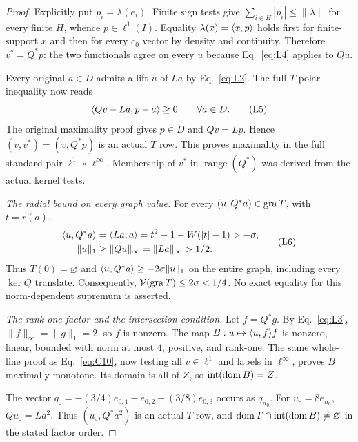 \begin{proof}
Explicitly put $p_i=\lambda(e_i)$. Finite sign tests give
$\sum_{i\in H}|p_i|\le\|\lambda\|$ for every finite $H$, whence
$p\in\ell^1(I)$. Equality $\lambda(x)=\langle x,p\rangle$ holds first for
finite-support $x$ and then for every $c_0$ vector by density and continuity.
Therefore $v^*=Q^*p$: the two functionals agree on every $u$ because
Eq.~\eqref{eq:L4} applies to $Qu$.

Every original $a\in D$ admits a lift $u$ of $La$ by Eq.~\eqref{eq:L2}.
The full $T$-polar inequality now reads
\begin{equation}
\langle Qv-La,p-a\rangle\ge0\qquad\forall a\in D.
\tag{L5}\label{eq:L5}
\end{equation}
The original maximality proof gives $p\in D$ and $Qv=Lp$. Hence
$(v,v^*)=(v,Q^*p)$ is an actual $T$ row. This proves maximality in the
full standard pair $\ell^1\times\ell^\infty$. Membership of $v^*$ in
$\operatorname{range}(Q^*)$ was derived from the actual kernel tests.

\noindent\textit{The radial bound on every graph value.}
\label{sec:L3}
For every $(u,Q^*a)\in\operatorname{gra} T$, with $t=r(a)$,
\begin{equation}
\begin{aligned}
\langle u,Q^*a\rangle&=\langle La,a\rangle
 =t^2-1-W(|t|-1)>-\sigma,\\
\|u\|_1&\ge\|Qu\|_\infty=\|La\|_\infty>1/2.
\end{aligned}
\tag{L6}\label{eq:L6}
\end{equation}
Thus $T(0)=\varnothing$ and $\langle u,Q^*a\rangle\ge-2\sigma\|u\|_1$ on
the entire graph, including every $\ker Q$ translate. Consequently,
$\mathcal V(\operatorname{gra} T)\le2\sigma<1/4$. No exact equality for this
norm-dependent supremum is asserted.

\noindent\textit{The rank-one factor and the intersection condition.}
\label{sec:L4}
Let $f=Q^*g$. By Eq.~\eqref{eq:L3}, $\|f\|_\infty=\|g\|_1=2$, so $f$
is nonzero. The map $B:u\mapsto\langle u,f\rangle f$ is nonzero, linear, bounded
with norm at most $4$, positive, and rank-one. The same whole-line proof
as Eq.~\eqref{eq:C10}, now testing all $v\in\ell^1$ and labels in
$\ell^\infty$, proves $B$ maximally monotone.
Its domain is all of $Z$, so $\operatorname{int}(\operatorname{dom} B)=Z$.

The vector $q_\circ=-(3/4)e_{0,1}-e_{0,2}-(3/8)e_{0,3}$ occurs as
$q_{n_0}$. For $u_\circ=8e_{n_0}$, $Qu_\circ=La^2$.
Thus $(u_\circ,Q^*a^2)$ is an actual $T$ row, and
$\operatorname{dom} T\cap\operatorname{int}(\operatorname{dom} B)\ne\varnothing$ in the stated
factor order.


\end{proof}
